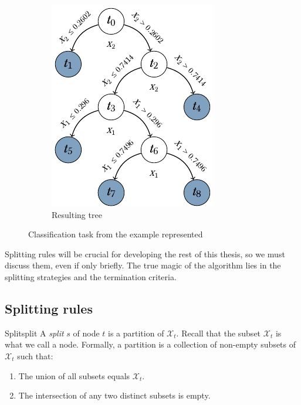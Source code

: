 \begin{figure}[h]
\begin{subfigure}[t]{0.45\textwidth}
        \includegraphics[width=\textwidth]{img/ctree.pdf}
        \caption{Resulting tree}
        \label{fig:tree-diagram}
    \end{subfigure}
    \caption{Classification task from the example represented}
    \label{figs:tree-example}
\end{figure}

Splitting rules will be crucial for developing the rest of this thesis, so we
must discuss them, even if only briefly. The true magic of the algorithm lies in
the splitting strategies and the termination criteria.

\subsection{Splitting rules}

\begin{dfn}{Split}{split}
    A \emph{split} $s$ of node $t$ is a partition of $\mathcal{X}_t$. Recall
    that the subset $\mathcal{X}_t$ is what we call a node. Formally, a
    partition is a collection of non-empty subsets of $\mathcal{X}_t$ such that:
    \begin{enumerate}
        \item The union of all subsets equals $\mathcal{X}_t$.
        \item The intersection of any two distinct subsets is empty.
    \end{enumerate}
\end{dfn}

